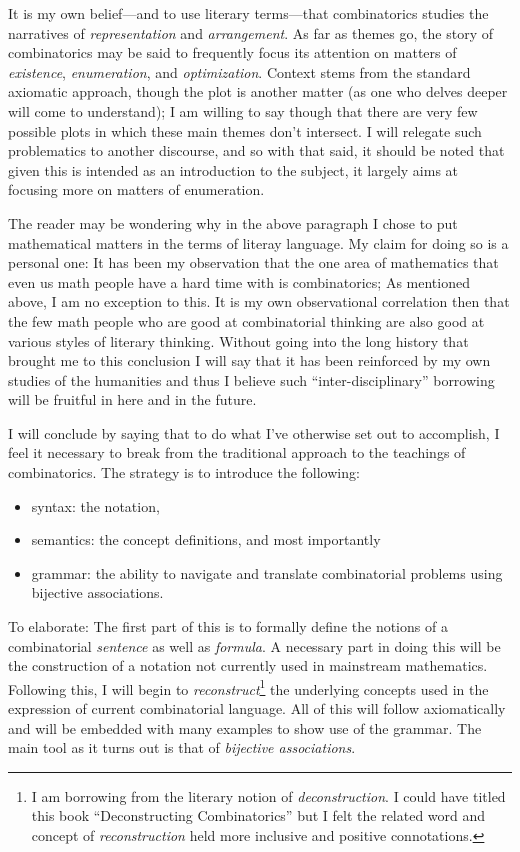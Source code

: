 \documentclass[twoside]{book}
\begin{document}
It is my own belief---and to use literary terms---that combinatorics studies the narratives of \emph{representation}
and \emph{arrangement}.  As far as themes go, the story of combinatorics may be said to frequently focus its
attention on matters of \emph{existence}, \emph{enumeration}, and \emph{optimization}.  Context stems from the
standard axiomatic approach, though the plot is another matter (as one who delves deeper will come to understand);
I am willing to say though that there are very few possible plots in which these main themes don't intersect.
I will relegate such problematics to another discourse, and so with that said, it should be noted that given this
is intended as an introduction to the subject, it largely aims at focusing more on matters of enumeration.

The reader may be wondering why in the above paragraph I chose to put mathematical matters in the terms of literay
language.  My claim for doing so is a personal one:  It has been my observation that the one area  of mathematics that
even us math people have a hard time with is combinatorics; As mentioned above, I am no exception to this.  It is my own
observational correlation then that the few math people who are good at combinatorial thinking are also good at various
styles of literary thinking.  Without going into the long history that brought me to this conclusion I will say that it
has been reinforced by my own studies of the humanities and thus I believe such ``inter-disciplinary'' borrowing will be
fruitful in here and in the future.

I will conclude by saying that to do what I've otherwise set out to accomplish, I feel it necessary to break from the
traditional approach to the teachings of combinatorics.  The strategy is to introduce the following:
\begin{itemize}
\item syntax: the notation,
\item semantics: the concept definitions, and most importantly
\item grammar: the ability to navigate and translate combinatorial problems using bijective associations.
\end{itemize}

To elaborate:  The first part of this is to formally define the notions of a combinatorial \emph{sentence} as well as
\emph{formula}.  A necessary part in doing this will be the construction of a notation not currently used in mainstream
mathematics.  Following this, I will begin to \emph{reconstruct}\footnote{I am borrowing from the literary notion of
\emph{deconstruction}.  I could have titled this book ``Deconstructing Combinatorics'' but I felt the related word and
concept of \emph{reconstruction} held more inclusive and positive connotations.} the underlying concepts used in the
expression of current combinatorial language.  All of this will follow axiomatically and will be embedded with many
examples to show use of the grammar.  The main tool as it turns out is that of \emph{bijective associations}.
\end{document}
